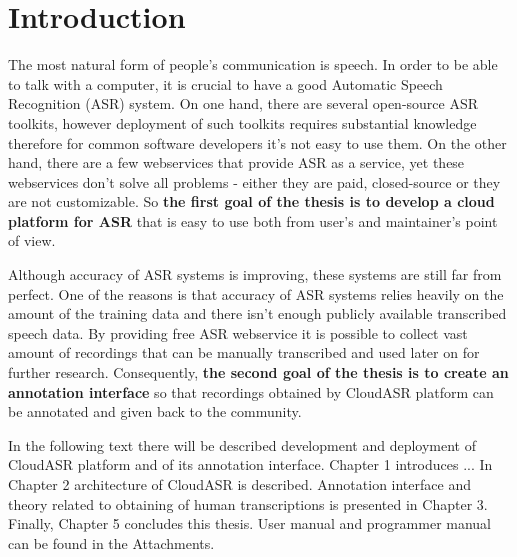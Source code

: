 \chapter*{Introduction}

The most natural form of people's communication is speech.
In order to be able to talk with a computer,
  it is crucial to have a good Automatic Speech Recognition (ASR) system.
On one hand, there are several open-source ASR toolkits,
  however deployment of such toolkits requires substantial knowledge therefore
  for common software developers it's not easy to use them.
On the other hand, there are a few webservices that provide ASR as a service,
  yet these webservices don't solve all problems -
  either they are paid, closed-source or they are not customizable.
So \textbf{the first goal of the thesis is to develop a cloud platform for ASR}
  that is easy to use both from user's and maintainer's point of view.

Although accuracy of ASR systems is improving,
  these systems are still far from perfect.
One of the reasons is that accuracy of ASR systems relies heavily on the amount of the training data
  and there isn't enough publicly available transcribed speech data.
By providing free ASR webservice it is possible to collect vast amount of recordings
  that can be manually transcribed and used later on for further research.
Consequently, \textbf{the second goal of the thesis is to create an annotation interface}
  so that recordings obtained by CloudASR platform can be annotated and given back to the community.

In the following text there will be described development and deployment of CloudASR platform and of its annotation interface.
Chapter 1 introduces ...
In Chapter 2 architecture of CloudASR is described.
Annotation interface and theory related to obtaining of human transcriptions is presented in Chapter 3.
Finally, Chapter 5 concludes this thesis.
User manual and programmer manual can be found in the Attachments.
